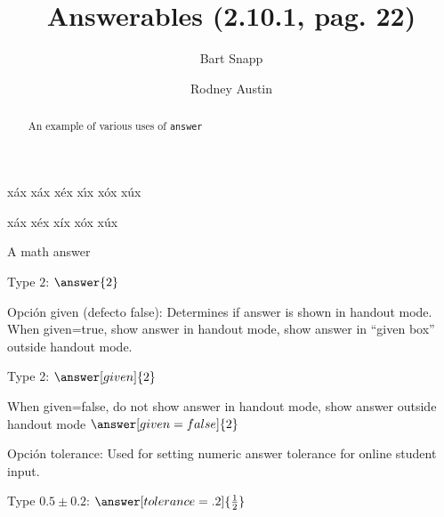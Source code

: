 \documentclass{ximera}
\title[Examples:]{Answerables (2.10.1, pag. 22)}
\author{Bart Snapp \and Rodney Austin}
\begin{document}
\begin{abstract}
  An example of various uses of \texttt{answer}
\end{abstract}
\maketitle

\begin{tcolorbox}
	\lipsum[1]
\end{tcolorbox}



x\'ax x\'{a}x x\'{e}x x\'{\i}x x\'{o}x x\'{u}x

xáx xéx xíx xóx xúx

A math answer

Type $2$: $\answer{2}$

Opci{\'{o}}n  {\ttfamily given} (defecto false): Determines if answer is shown in handout mode. 
When given=true, show answer in handout mode, show answer in ``given box'' outside handout mode. 

Type 2: $\answer[given]{2}$

When given=false, do not show answer in handout mode, show answer outside handout mode  
$\answer[given=false]{2}$

Opci\'{o}n {\ttfamily tolerance}: Used for setting numeric answer tolerance for online student input.

Type $0.5\pm 0.2$: $\answer[tolerance=.2]{\frac{1}{2}}$
\end{document}

